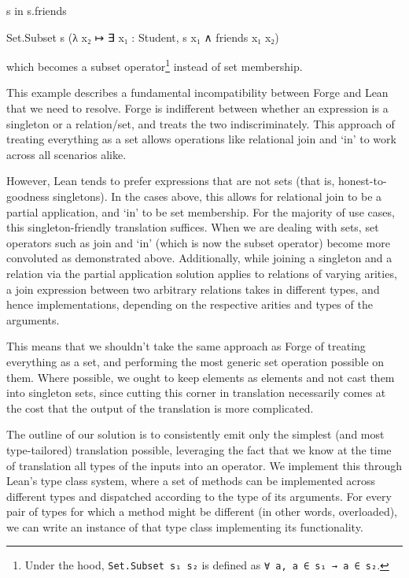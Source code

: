 \vspace{0.5em}
\noindent\begin{minipage}{0.3\textwidth}
\begin{forge*}
s in s.friends
\end{forge*}
\end{minipage}%
\begin{minipage}{0.7\textwidth}
\begin{lean*}
Set.Subset s (λ x₂ ↦ ∃ x₁ : Student, s x₁ ∧ friends x₁ x₂)
\end{lean*}
\end{minipage}
\vspace{0.5em}\newline
which becomes a subset operator\footnote{Under the hood, \texttt{Set.Subset s₁ s₂} is defined as \texttt{∀ a, a ∈ s₁ → a ∈ s₂}.} instead of set membership. 

This example describes a fundamental incompatibility between Forge and Lean that we need to resolve. Forge is indifferent between whether an expression is a singleton or a relation/set, and treats the two indiscriminately. This approach of treating everything as a set allows operations like relational join and `in' to work across all scenarios alike. 

However, Lean tends to prefer expressions that are not sets (that is, honest-to-goodness singletons). In the cases above, this allows for relational join to be a partial application, and `in' to be set membership. For the majority of use cases, this singleton-friendly translation suffices. When we are dealing with sets, set operators such as join and `in' (which is now the subset operator) become more convoluted as demonstrated above. Additionally, while joining a singleton and a relation via the partial application solution applies to relations of varying arities, a join expression between two arbitrary relations takes in different types, and hence implementations, depending on the respective arities and types of the arguments. 

This means that we shouldn't take the same approach as Forge of treating everything as a set, and performing the most generic set operation possible on them. Where possible, we ought to keep elements as elements and not cast them into singleton sets, since cutting this corner in translation necessarily comes at the cost that the output of the translation is more complicated. 

The outline of our solution is to consistently emit only the simplest (and most type-tailored) translation possible, leveraging the fact that we know at the time of translation all types of the inputs into an operator. We implement this through Lean's type class system, where a set of methods can be implemented across different types and dispatched according to the type of its arguments. For every pair of types for which a method might be different (in other words, overloaded), we can write an instance of that type class implementing its functionality. 

